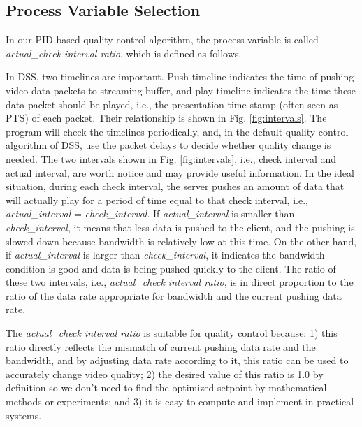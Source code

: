 \documentclass[journal]{IEEEtran}
\begin{document}
\subsection{Process Variable Selection}
\label{subsec:process-variable}

In our PID-based quality control algorithm, the process variable is called \textit{actual\_check interval ratio}, which is defined as follows.

In DSS, two timelines are important. Push timeline indicates the time of pushing video data packets to streaming buffer, and play timeline indicates the time these data packet should be played, i.e., the presentation time stamp (often seen as PTS) of each packet. Their relationship is shown in Fig. \ref{fig:intervals}. The program will check the timelines periodically, and, in the default quality control algorithm of DSS, use the packet delays to decide whether quality change is needed. The two intervals shown in Fig. \ref{fig:intervals}, i.e., check interval and actual interval, are worth notice and may provide useful information. In the ideal situation, during each check interval, the server pushes an amount of data that will actually play for a period of time equal to that check interval, i.e., \textit{actual\_interval} = \textit{check\_interval}. If \textit{actual\_interval} is smaller than \textit{check\_interval}, it means that less data is pushed to the client, and the pushing is slowed down because bandwidth is relatively low at this time. On the other hand, if \textit{actual\_interval} is larger than \textit{check\_interval}, it indicates the bandwidth condition is good and data is being pushed quickly to the client. The ratio of these two intervals, i.e., \textit{actual\_check interval ratio}, is in direct proportion to the ratio of the data rate appropriate for bandwidth and the current pushing data rate.

The \textit{actual\_check interval ratio} is suitable for quality control because: 1) this ratio directly reflects the mismatch of current pushing data rate and the bandwidth, and by adjusting data rate according to it, this ratio can be used to accurately change video quality; 2) the desired value of this ratio is 1.0 by definition so we don't need to find the optimized setpoint by mathematical methods or experiments; and 3) it is easy to compute and implement in practical systems.
\end{document}
